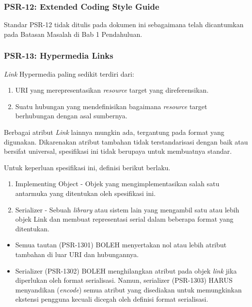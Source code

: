 \subsubsection{PSR-12: Extended Coding Style Guide}
\label{subsubsec:psr12}
Standar PSR-12 tidak ditulis pada dokumen ini sebagaimana telah dicantumkan pada Batasan Masalah di Bab 1 Pendahuluan.


\subsubsection{PSR-13: Hypermedia Links}
\label{subsubsec:psr13}
\textit{Link} Hypermedia paling sedikit terdiri dari:
\begin{enumerate}
	\item URI yang merepresentasikan \textit{resource} target yang direferensikan.
	\item Suatu hubungan yang mendefinisikan bagaimana \textit{resource} target berhubungan dengan asal sumbernya.
\end{enumerate}

Berbagai atribut \textit{Link} lainnya mungkin ada, tergantung pada format yang digunakan. Dikarenakan atribut tambahan tidak terstandarisasi dengan baik atau bersifat universal, spesifikasi ini tidak berupaya untuk membuatnya standar.

Untuk keperluan spesifikasi ini, definisi berikut berlaku.
\begin{enumerate}
	\item Implementing Object - Objek yang mengimplementasikan salah satu antarmuka yang ditentukan oleh spesifikasi ini.
	\item Serializer - Sebuah \textit{library} atau sistem lain yang mengambil satu atau lebih objek Link dan membuat representasi serial dalam beberapa format yang ditentukan.
\end{enumerate}

\begin{itemize}
	\item Semua tautan (PSR-1301) BOLEH menyertakan nol atau lebih atribut tambahan di luar URI dan hubungannya.
	\item Serializer (PSR-1302) BOLEH menghilangkan atribut pada objek \textit{link} jika diperlukan oleh format serialisasi. Namun, serializer (PSR-1303) HARUS menyandikan (\textit{encode}) semua atribut yang disediakan untuk memungkinkan ekstensi pengguna kecuali dicegah oleh definisi format serialisasi.
\end{itemize}


